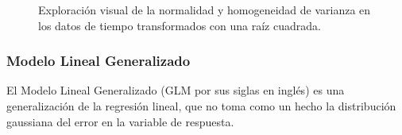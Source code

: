\begin{figure}[H]
\centering
\caption{Exploración visual de la normalidad y homogeneidad de varianza en los datos de tiempo transformados con una raíz cuadrada.}
\label{fig:transformacion-sqrt}
\end{figure}

\subsubsection{Modelo Lineal Generalizado}

El Modelo Lineal Generalizado (GLM por sus siglas en inglés) es una generalización de la regresión lineal, que no toma como un hecho la distribución gaussiana del error en la variable de respuesta\cite{Montgomery2001}.

